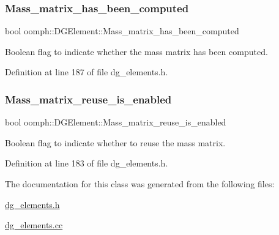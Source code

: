 \subsubsection{\texorpdfstring{Mass\+\_\+matrix\+\_\+has\+\_\+been\+\_\+computed}{Mass\_matrix\_has\_been\_computed}}
{\footnotesize\ttfamily bool oomph\+::\+D\+G\+Element\+::\+Mass\+\_\+matrix\+\_\+has\+\_\+been\+\_\+computed\hspace{0.3cm}{\ttfamily [protected]}}



Boolean flag to indicate whether the mass matrix has been computed. 



Definition at line 187 of file dg\+\_\+elements.\+h.

\mbox{\label{classoomph_1_1DGElement_ab2078ea04b7bc4d615498f3b6bff13dd}} 
\subsubsection{\texorpdfstring{Mass\+\_\+matrix\+\_\+reuse\+\_\+is\+\_\+enabled}{Mass\_matrix\_reuse\_is\_enabled}}
{\footnotesize\ttfamily bool oomph\+::\+D\+G\+Element\+::\+Mass\+\_\+matrix\+\_\+reuse\+\_\+is\+\_\+enabled\hspace{0.3cm}{\ttfamily [protected]}}



Boolean flag to indicate whether to reuse the mass matrix. 



Definition at line 183 of file dg\+\_\+elements.\+h.



The documentation for this class was generated from the following files\+:\begin{DoxyCompactItemize}
\item 
\hyperlink{dg__elements_8h}{dg\+\_\+elements.\+h}\item 
\hyperlink{dg__elements_8cc}{dg\+\_\+elements.\+cc}\end{DoxyCompactItemize}
